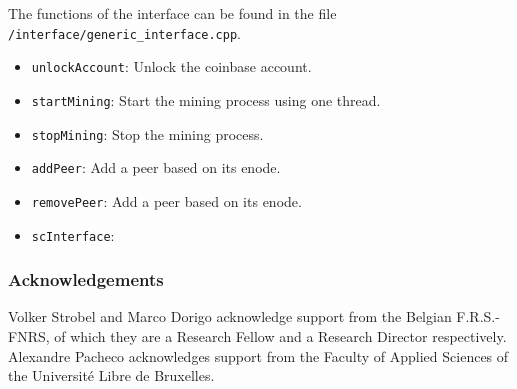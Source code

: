 \documentclass{article}
\begin{document}
The functions of the interface can be found in the file
\texttt{/interface/generic_interface.cpp}.


\begin{itemize}
\item \texttt{unlockAccount}: Unlock the coinbase account.
\item \texttt{startMining}: Start the mining process using one thread.
\item \texttt{stopMining}: Stop the mining process.
\item \texttt{addPeer}: Add a peer based on its enode.
\item \texttt{removePeer}: Add a peer based on its enode.
\item \texttt{scInterface}: 
\end{itemize}

\subsubsection*{Acknowledgements}

Volker Strobel and Marco Dorigo acknowledge support from the Belgian
F.R.S.-FNRS, of which they are a Research Fellow and a Research
Director respectively. Alexandre Pacheco acknowledges support from the
Faculty of Applied Sciences of the Universit\'{e} Libre de Bruxelles.




\end{document}
